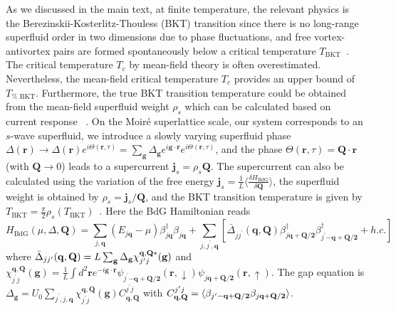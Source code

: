 \documentclass[twocolumn,english,prl,floatfix,citeautoscript,nofootinbib]{revtex4}
\begin{document}
\begin{widetext}
As we discussed in the main text, at finite temperature, the relevant
physics is the Berezinskii-Kosterlitz-Thouless (BKT) transition since there
is no long-range superfluid order in two dimensions due to phase
fluctuations, and free vortex-antivortex pairs are formed spontaneously
below a critical temperature $T_{\text{BKT}}$~\cite{PhysRevLett.109.105302S,PhysRevLett.114.110401S}. The critical temperature $%
T_{c}$ by mean-field theory is often overestimated. Nevertheless, the
mean-field critical temperature $T_{c}$ provides an upper bound of $T_{\text{%
BKT}}$. Furthermore, the true BKT transition temperature could be obtained
from the mean-field superfluid weight $\rho _{s}$ which can be calculated
based on current response~\cite{PhysRevLett.112.086401S,julku2018superfluidS}%
. On the Moir\'{e} superlattice scale, our system corresponds to an $s$-wave
superfluid, we introduce a slowly varying superfluid phase $\Delta (\mathbf{r%
})\rightarrow \Delta (\mathbf{r})e^{i\Theta (\mathbf{r},\tau)}=\sum_{\mathbf{g}%
}\Delta _{\mathbf{g}}e^{i\mathbf{g}\cdot \mathbf{r}}e^{i\Theta (\mathbf{r}%
,\tau)}$, and the phase $\Theta (\mathbf{r},\tau)=\mathbf{Q}\cdot \mathbf{r}$
(with $\mathbf{Q}\rightarrow 0$) leads to a supercurrent $\mathbf{j}%
_{s}=\rho _{s}\mathbf{Q}$. The supercurrent can also be calculated using the
variation of the free energy $\mathbf{j}_{s}=\frac{1}{L}\langle \frac{\delta
H_{\text{BdG}}}{\delta \mathbf{Q}}\rangle $, the superfluid weight is
obtained by $\rho _{s}=\mathbf{j}_{s}/\mathbf{Q}$, and the BKT transition
temperature is given by $T_{\text{BKT}}=\frac{\pi }{2}\rho _{s}(T_{\text{BKT}%
})$~\cite{PhysRevLett.112.086401S,julku2018superfluidS}. Here the BdG
Hamiltonian reads
\begin{equation}
H_{\text{BdG}}(\mu ,\Delta ,\mathbf{Q})=\sum_{j,\mathbf{q}}(E_{j\mathbf{q}%
}-\mu)\beta _{j\mathbf{q}}^{\dag }\beta _{j\mathbf{q}}+\sum_{j,j^{\prime },%
\mathbf{q}}[\bar{\Delta}_{jj^{\prime }}(\mathbf{q,Q})\beta _{j\mathbf{q+Q/2}%
}^{\dag }\beta _{j^{\prime }\mathbf{-q+Q/2}}^{\dag }+h.c.]
\end{equation}%
where $\bar{\Delta}_{jj^{\prime }}(\mathbf{q,Q})=L\sum_{\mathbf{g}}\Delta _{%
\mathbf{g}}\chi _{j^{\prime }j}^{\mathbf{q,Q}\ast }(\mathbf{g})$ and $\chi
_{j^{\prime }j}^{\mathbf{q,Q}}(\mathbf{g})=\frac{1}{L}\int d^{2}\mathbf{r}%
e^{-i\mathbf{g}\cdot \mathbf{r}}\psi _{j^{\prime }\mathbf{-q+Q/2}}(\mathbf{r}%
,\downarrow )\psi _{j\mathbf{q+Q/2}}(\mathbf{r},\uparrow )$. The gap
equation is $\Delta _{\mathbf{g}}=U_{0}\sum_{j^{\prime },j,\mathbf{q}}\chi
_{j^{\prime }j}^{\mathbf{q,Q}}(\mathbf{g})C_{\mathbf{q,Q}}^{j^{\prime }j}$
with $C_{\mathbf{q,Q}}^{j^{\prime }j}=\langle \beta _{j^{\prime }\mathbf{%
-q+Q/2}}\beta _{j\mathbf{q+Q/2}}\rangle $.


\end{widetext}
\end{document}
